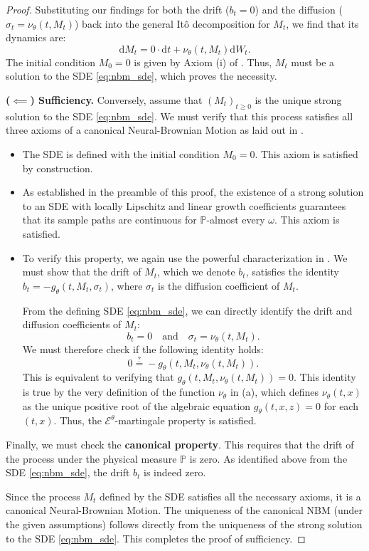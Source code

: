 \documentclass[qian]{imsart}
\newcommand{\Prob}{\mathbb{P}}
\newcommand{\cEneutheta}{\mathcal{E}^{\theta}}
\newcommand{\dd}{\mathrm{d}}
\theoremstyle{plain}
\theoremstyle{definition}
\begin{document}
\begin{proof}
Substituting our findings for both the drift ($b_t=0$) and the diffusion ($\sigma_t=\nu_\theta(t,M_t)$) back into the general Itô decomposition for $M_t$, we find that its dynamics are:
\[ \dd M_t = 0 \cdot \dd t + \nu_\theta(t, M_t) \dd W_t. \]
The initial condition $M_0=0$ is given by Axiom (i) of . Thus, $M_t$ must be a solution to the SDE \eqref{eq:nbm_sde}, which proves the necessity.

\textbf{($\impliedby$) Sufficiency.} Conversely, assume that $(M_t)_{t \ge 0}$ is the unique strong solution to the SDE \eqref{eq:nbm_sde}. We must verify that this process satisfies all three axioms of a canonical Neural-Brownian Motion as laid out in .

\begin{itemize}
    \item[\textbf{(i) Initial Value:}] The SDE is defined with the initial condition $M_0=0$. This axiom is satisfied by construction.

    \item[\textbf{(ii) Continuity:}] As established in the preamble of this proof, the existence of a strong solution to an SDE with locally Lipschitz and linear growth coefficients guarantees that its sample paths are continuous for $\Prob$-almost every $\omega$. This axiom is satisfied.

    \item[\textbf{(iii) $\cEneutheta$-Martingale Property:}] To verify this property, we again use the powerful characterization in . We must show that the drift of $M_t$, which we denote $b_t$, satisfies the identity $b_t = -g_\theta(t, M_t, \sigma_t)$, where $\sigma_t$ is the diffusion coefficient of $M_t$.
    
    From the defining SDE \eqref{eq:nbm_sde}, we can directly identify the drift and diffusion coefficients of $M_t$:
    \[ b_t = 0 \quad \text{and} \quad \sigma_t = \nu_\theta(t, M_t). \]
    We must therefore check if the following identity holds:
    \[ 0 \stackrel{?}{=} -g_\theta(t, M_t, \nu_\theta(t, M_t)). \]
    This is equivalent to verifying that $g_\theta(t, M_t, \nu_\theta(t, M_t)) = 0$. This identity is true by the very definition of the function $\nu_\theta$ in (a), which defines $\nu_\theta(t,x)$ as the unique positive root of the algebraic equation $g_\theta(t,x,z)=0$ for each $(t,x)$. Thus, the $\cEneutheta$-martingale property is satisfied.
\end{itemize}

Finally, we must check the \textbf{canonical property}. This requires that the drift of the process under the physical measure $\Prob$ is zero. As identified above from the SDE \eqref{eq:nbm_sde}, the drift $b_t$ is indeed zero.

Since the process $M_t$ defined by the SDE satisfies all the necessary axioms, it is a canonical Neural-Brownian Motion. The uniqueness of the canonical NBM (under the given assumptions) follows directly from the uniqueness of the strong solution to the SDE \eqref{eq:nbm_sde}. This completes the proof of sufficiency.
\end{proof}
\end{document}
